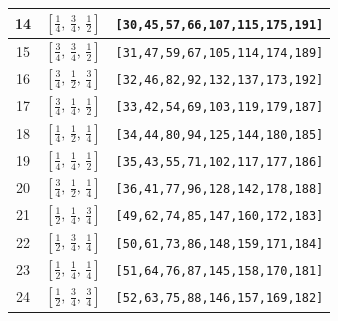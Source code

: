 \documentclass[fleqn,8pt]{jsarticle}
\begin{document}
\begin{longtable}{ccc}
14 & $\left[ \frac{1}{4},\, \frac{3}{4},\, \frac{1}{2} \right]$ & {\tt [30,45,57,66,107,115,175,191]} \\ \hline
15 & $\left[ \frac{3}{4},\, \frac{3}{4},\, \frac{1}{2} \right]$ & {\tt [31,47,59,67,105,114,174,189]} \\ \hline
16 & $\left[ \frac{3}{4},\, \frac{1}{2},\, \frac{3}{4} \right]$ & {\tt [32,46,82,92,132,137,173,192]} \\ \hline
17 & $\left[ \frac{3}{4},\, \frac{1}{4},\, \frac{1}{2} \right]$ & {\tt [33,42,54,69,103,119,179,187]} \\ \hline
18 & $\left[ \frac{1}{4},\, \frac{1}{2},\, \frac{1}{4} \right]$ & {\tt [34,44,80,94,125,144,180,185]} \\ \hline
19 & $\left[ \frac{1}{4},\, \frac{1}{4},\, \frac{1}{2} \right]$ & {\tt [35,43,55,71,102,117,177,186]} \\ \hline
20 & $\left[ \frac{3}{4},\, \frac{1}{2},\, \frac{1}{4} \right]$ & {\tt [36,41,77,96,128,142,178,188]} \\ \hline
21 & $\left[ \frac{1}{2},\, \frac{1}{4},\, \frac{3}{4} \right]$ & {\tt [49,62,74,85,147,160,172,183]} \\ \hline
22 & $\left[ \frac{1}{2},\, \frac{3}{4},\, \frac{1}{4} \right]$ & {\tt [50,61,73,86,148,159,171,184]} \\ \hline
23 & $\left[ \frac{1}{2},\, \frac{1}{4},\, \frac{1}{4} \right]$ & {\tt [51,64,76,87,145,158,170,181]} \\ \hline
24 & $\left[ \frac{1}{2},\, \frac{3}{4},\, \frac{3}{4} \right]$ & {\tt [52,63,75,88,146,157,169,182]} \\
\end{longtable}
\renewcommand{\arraystretch}{1.2}
\end{document}
